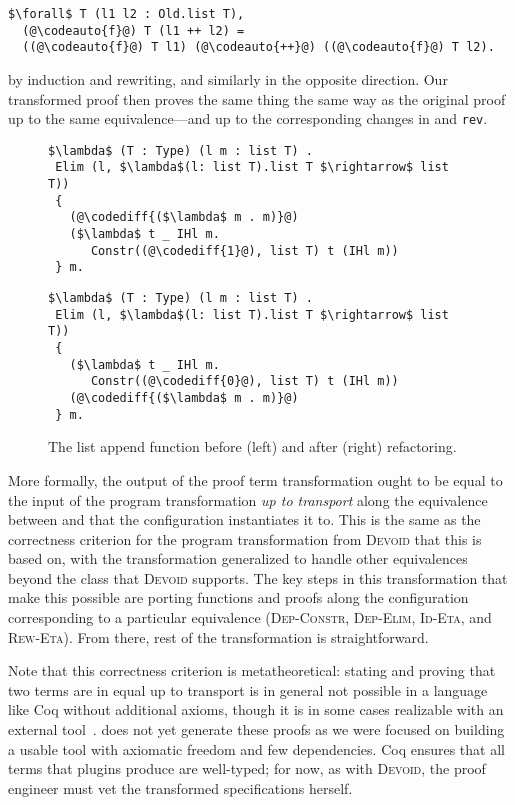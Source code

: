 \begin{lstlisting}
$\forall$ T (l1 l2 : Old.list T),
  (@\codeauto{f}@) T (l1 ++ l2) =
  ((@\codeauto{f}@) T l1) (@\codeauto{++}@) ((@\codeauto{f}@) T l2).
\end{lstlisting}
by induction and rewriting, and similarly in the opposite direction.
Our transformed proof  then proves the same thing the same way
as the original proof up to the same equivalence---and up to the corresponding changes in \codeauto{\lstinline{++}}
and \lstinline{rev}.

\begin{figure}
\begin{minipage}{0.48\textwidth}
\begin{lstlisting}
$\lambda$ (T : Type) (l m : list T) .
 Elim (l, $\lambda$(l: list T).list T $\rightarrow$ list T))
 {
   (@\codediff{($\lambda$ m . m)}@)
   ($\lambda$ t _ IHl m.
      Constr((@\codediff{1}@), list T) t (IHl m))
 } m.
\end{lstlisting}
\end{minipage}
\hfill
\begin{minipage}{0.48\textwidth}
\begin{lstlisting}
$\lambda$ (T : Type) (l m : list T) .
 Elim (l, $\lambda$(l: list T).list T $\rightarrow$ list T))
 {
   ($\lambda$ t _ IHl m.
      Constr((@\codediff{0}@), list T) t (IHl m))
   (@\codediff{($\lambda$ m . m)}@)
 } m.
\end{lstlisting}
\end{minipage}
\caption{The list append function before (left) and after (right) refactoring.}
\label{fig:appswap1}
\end{figure}

More formally, the output of the proof term transformation ought to be equal to the input of the program transformation
\textit{up to transport} along the equivalence between \A and \B that the configuration instantiates it to.
This is the same as the correctness criterion for the program transformation from \textsc{Devoid} that this is based on,
with the transformation generalized to handle other equivalences beyond the class that \textsc{Devoid} supports.
The key steps in this transformation that make this possible are porting functions and proofs along the configuration corresponding
to a particular equivalence (\textsc{Dep-Constr}, \textsc{Dep-Elim}, \textsc{Id-Eta}, and \textsc{Rew-Eta}).
From there, rest of the transformation is straightforward.

Note that this correctness criterion is metatheoretical:
stating and proving that two terms are in equal up to transport is in general not possible in a language like Coq
without additional axioms, though it is in some cases realizable with an external tool~\cite{tabareau2017equivalences}.
\toolname does not yet generate these proofs as we were focused on building a usable tool with axiomatic freedom and few dependencies.
Coq ensures that all terms that plugins produce are well-typed; for now, as with \textsc{Devoid}, the proof engineer must vet the transformed
specifications herself.

